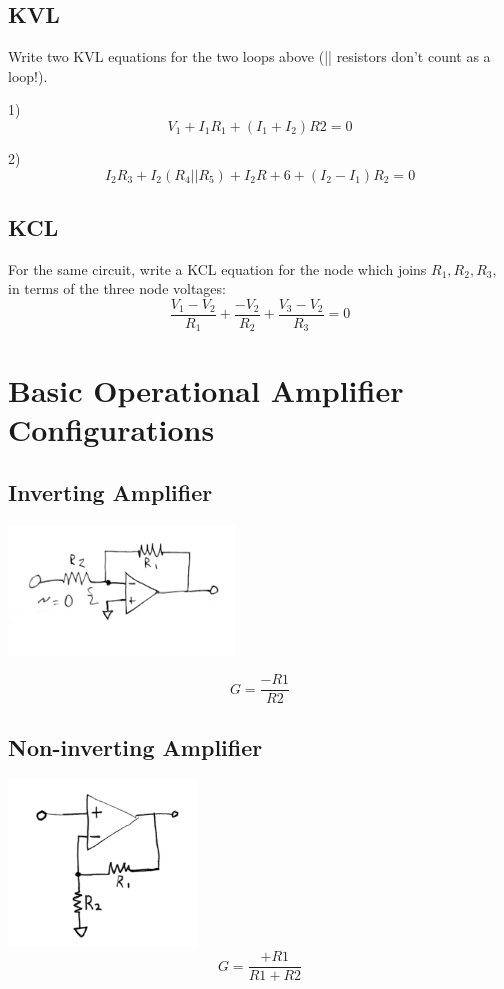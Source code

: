 \subsection{KVL}
 Write two KVL equations for the two loops above (|| resistors don't count as a loop!).

1)
\[
V_1+I_1R_1+(I_1+I_2)R2=0
\]

2)
\[
I_2R_3+I_2(R_4||R_5)+I_2R+6+(I_2-I_1)R_2=0
\]

\subsection{KCL}
For the same circuit, write a KCL equation for the node which joins $R_1,R_2,R_3$,  in terms
of the three node voltages:
\[
\frac{V_1-V_2}{R_1}+\frac{-V_2}{R_2} + \frac{V_3-V_2}{R_3} = 0
\]


\section{Basic Operational Amplifier Configurations}


\subsection{Inverting Amplifier}

\includegraphics[width=60mm]{figsChapt01/BV83562.png}


\[
G = \frac {-R1}  {R2}
\]
\subsection{Non-inverting Amplifier}
\includegraphics[width=50mm]{figsChapt01/PN49388.png}
\[
G=\frac {+R1}  {R1+R2}
\]
